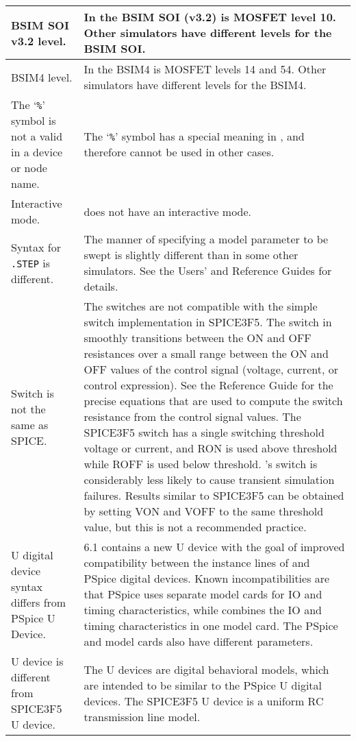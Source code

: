 \begin{longtable}[h] {>{\raggedright\small}m{2in}|>{\raggedright\let\\\tabularnewline\small}m{3.5in}}
    BSIM SOI v3.2 level. & In \Xyce{} the BSIM SOI (v3.2) is MOSFET level 10.  
    Other simulators have different levels for the BSIM SOI. \\ \hline

    BSIM4 level. & In \Xyce{} the BSIM4 is MOSFET levels 14 and 54.  
    Other simulators have different levels for the BSIM4. \\ \hline

    The `\texttt{\%}' symbol is not a valid in a device or node name. &
    The `\texttt{\%}' symbol has a special meaning in \Xyce{}, and therefore cannot
    be used in other cases. \\ \hline

    Interactive mode. & \Xyce{} does not have an interactive mode. \\ \hline

    Syntax for \texttt{.STEP} is different. & The manner of specifying
    a model parameter to be swept is slightly different than in some
    other simulators.  See the \Xyce{} Users' and Reference Guides for
    details.  \\ \hline

    Switch is not the same as SPICE. &  The \Xyce{} switches are not
	compatible with the simple switch implementation in SPICE3F5.  The
	switch in \Xyce{} smoothly transitions between the ON and OFF
	resistances over a small range between the ON and OFF values of the
	control signal (voltage, current, or control expression).  See the
	\Xyce{} Reference Guide for the precise equations that are used to compute the
	switch resistance from the control signal values.  The SPICE3F5 switch
	has a single switching threshold voltage or current, and RON is used
	above threshold while ROFF is used below threshold.  \Xyce{}'s switch is
	considerably less likely to cause transient simulation failures. Results
	similar to SPICE3F5 can be obtained by setting VON and VOFF to the same
	threshold value, but this is not a recommended practice.  \\ \hline

    U digital device syntax differs from PSpice U Device. &  \Xyce{} 6.1 
       contains a new U device with the goal of improved compatibility between
       the instance lines of \Xyce{} and PSpice digital devices.  Known
       incompatibilities are that PSpice uses separate model cards for
       IO and timing characteristics, while \Xyce{} combines the IO and timing
       characteristics in one model card.  The PSpice and \Xyce{} model cards
       also have different parameters. \\ \hline

    U device is different from SPICE3F5 U device. &  The \Xyce{} U devices are
       digital behavioral models, which are intended to be similar to the
       PSpice U digital devices.  The SPICE3F5 U device is a uniform RC
       transmission line model. \\ \hline 

\end{longtable}

